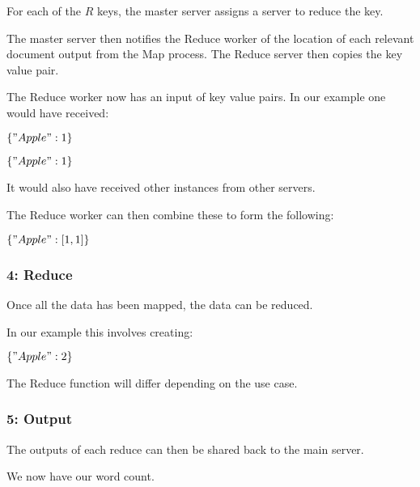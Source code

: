 For each of the \(R\) keys, the master server assigns a server to reduce the key.

The master server then notifies the Reduce worker of the location of each relevant document output from the Map process. The Reduce server then copies the key value pair.

The Reduce worker now has an input of key value pairs. In our example one would have received:

\(\{"Apple": 1\}\)

\(\{"Apple": 1\}\)

It would also have received other instances from other servers.

The Reduce worker can then combine these to form the following:

\(\{"Apple": [1,1]\}\)

\subsubsection{4: Reduce}

Once all the data has been mapped, the data can be reduced.

In our example this involves creating:

\(\{"Apple": 2\}\)

The Reduce function will differ depending on the use case.

\subsubsection{5: Output}

The outputs of each reduce can then be shared back to the main server.

We now have our word count.

